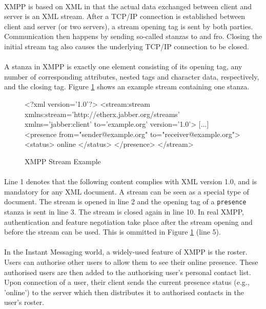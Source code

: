 \paragraph{}
XMPP is based on XML in that the actual data exchanged between client and server is an XML stream. After a TCP/IP connection is established between client and server (or two servers), a stream opening tag is sent by both parties. Communication then happens by sending so-called stanzas to and fro. Closing the initial stream tag also causes the underlying TCP/IP connection to be closed.
\paragraph{}
A stanza in XMPP is exactly one element consisting of its opening tag, any number of corresponding attributes, nested tags and character data, respectively, and the closing tag. Figure \ref{fig:streamExample} shows an example stream containing one stanza.

\begin{figure}[H]
\begin{listing}{1}
<?xml version='1.0'?>
<stream:stream 
      xmlns:stream='http://etherx.jabber.org/streams' 
      xmlns='jabber:client' to='example.org' version='1.0'>
[...]
  <presence from="sender@example.org"
        to="receiver@example.org">
    <status>
      online
    </status>
  </presence>
</stream>
\end{listing}
\caption{XMPP Stream Example}
\label{fig:streamExample}
\end{figure}

\paragraph{}
Line 1 denotes that the following content complies with XML version 1.0, and is mandatory for any XML document. A stream can be seen as a special type of document. The stream is opened in line 2 and the opening tag of a \texttt{presence} stanza is sent in line 3. The stream is closed again in line 10. In real XMPP, authentication and feature negotiation take place after the stream opening and before the stream can be used. This is ommitted in Figure \ref{fig:streamExample} (line 5).
\paragraph{}
In the Instant Messaging world, a widely-used feature of XMPP is the roster. Users can authorise other users to allow them to see their online presence. These authorised users are then added to the authorising user's personal contact list. Upon connection of a user, their client sends the current presence status (e.g., 'online') to the server which then distributes it to authorised contacts in the user's roster.

